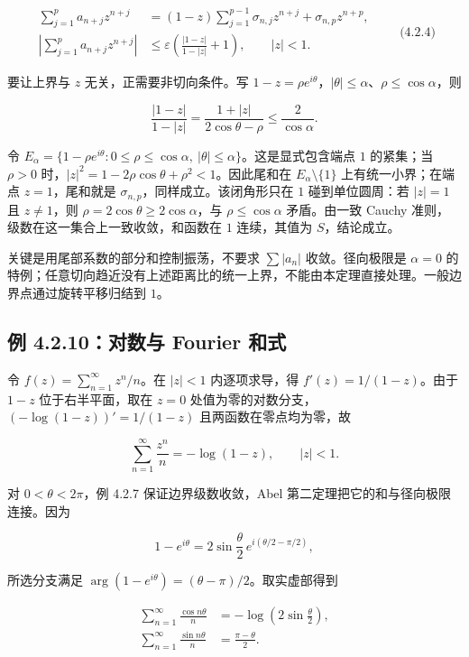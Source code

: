\documentclass[11pt,a4paper]{article}
\begin{document}
\[
\begin{aligned}
\sum_{j=1}^p a_{n+j}z^{n+j}
&=(1-z)\sum_{j=1}^{p-1}\sigma_{n,j}z^{n+j}+\sigma_{n,p}z^{n+p},\\
\left|\sum_{j=1}^p a_{n+j}z^{n+j}\right|
&\le\varepsilon\left(\frac{|1-z|}{1-|z|}+1\right),\qquad |z|<1.
\end{aligned}
\qquad\text{(4.2.4)}
\]

要让上界与 \(z\) 无关，正需要非切向条件。写
\(1-z=\rho e^{i\theta}\)，\(|\theta|\le\alpha\)、\(\rho\le\cos\alpha\)，则

\[
\frac{|1-z|}{1-|z|}
=\frac{1+|z|}{2\cos\theta-\rho}
\le\frac{2}{\cos\alpha}.
\]

令
\(E_\alpha=\{1-\rho e^{i\theta}:0\le\rho\le\cos\alpha,\ |\theta|\le\alpha\}\)。这是显式包含端点
\(1\) 的紧集；当 \(\rho>0\)
时，\(|z|^2=1-2\rho\cos\theta+\rho^2<1\)。因此尾和在
\(E_\alpha\setminus\{1\}\) 上有统一小界；在端点 \(z=1\)，尾和就是
\(\sigma_{n,p}\)，同样成立。该闭角形只在 \(1\) 碰到单位圆周：若
\(|z|=1\) 且 \(z\ne1\)，则 \(\rho=2\cos\theta\ge2\cos\alpha\)，与
\(\rho\le\cos\alpha\) 矛盾。由一致 Cauchy
准则，级数在这一集合上一致收敛，和函数在 \(1\) 连续，其值为
\(S\)，结论成立。

关键是用尾部系数的部分和控制振荡，不要求 \(\sum|a_n|\) 收敛。径向极限是
\(\alpha=0\)
的特例；任意切向趋近没有上述距离比的统一上界，不能由本定理直接处理。一般边界点通过旋转平移归结到
\(1\)。

\subsection{例 4.2.10：对数与 Fourier 和式}\label{ch04-s2-heading-5}

令 \(f(z)=\sum_{n=1}^{\infty}z^n/n\)。在 \(|z|<1\) 内逐项求导，得
\(f'(z)=1/(1-z)\)。由于 \(1-z\) 位于右半平面，取在 \(z=0\)
处值为零的对数分支，\((-\log(1-z))'=1/(1-z)\) 且两函数在零点均为零，故

\[
\sum_{n=1}^{\infty}\frac{z^n}{n}=-\log(1-z),\qquad |z|<1.
\]

对 \(0<\theta<2\pi\)，例 4.2.7 保证边界级数收敛，Abel
第二定理把它的和与径向极限连接。因为

\[
1-e^{i\theta}=2\sin\frac\theta2\,e^{i(\theta/2-\pi/2)},
\]

所选分支满足 \(\arg(1-e^{i\theta})=(\theta-\pi)/2\)。取实虚部得到

\[
\begin{aligned}
\sum_{n=1}^{\infty}\frac{\cos n\theta}{n}
&=-\log\left(2\sin\frac\theta2\right),\\
\sum_{n=1}^{\infty}\frac{\sin n\theta}{n}
&=\frac{\pi-\theta}{2}.
\end{aligned}
\]
\end{document}
